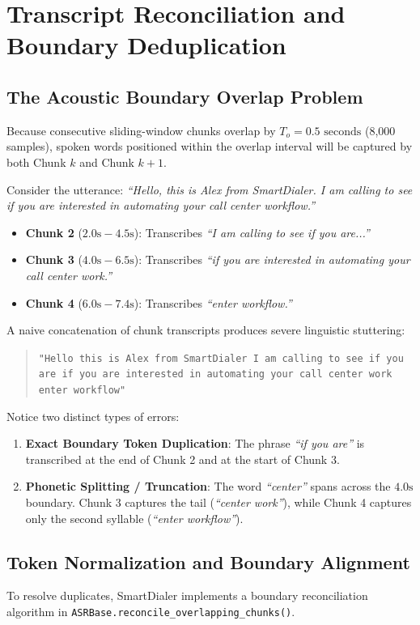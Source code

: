 \documentclass[11pt,a4paper,titlepage]{report}
\begin{document}
\newpage

\chapter{Transcript Reconciliation and Boundary Deduplication}

\section{The Acoustic Boundary Overlap Problem}
Because consecutive sliding-window chunks overlap by $T_o = 0.5\text{ seconds}$ (8,000 samples), spoken words positioned within the overlap interval will be captured by both Chunk $k$ and Chunk $k+1$. 

Consider the utterance: \textit{``Hello, this is Alex from SmartDialer. I am calling to see if you are interested in automating your call center workflow.''}
\begin{itemize}
    \item \textbf{Chunk 2} ($2.0\text{s} - 4.5\text{s}$): Transcribes \textit{``I am calling to see if you are...''}
    \item \textbf{Chunk 3} ($4.0\text{s} - 6.5\text{s}$): Transcribes \textit{``if you are interested in automating your call center work.''}
    \item \textbf{Chunk 4} ($6.0\text{s} - 7.4\text{s}$): Transcribes \textit{``enter workflow.''}
\end{itemize}

A naive concatenation of chunk transcripts produces severe linguistic stuttering:
\begin{quote}
    \texttt{"Hello this is Alex from SmartDialer I am calling to see if you are if you are interested in automating your call center work enter workflow"}
\end{quote}
Notice two distinct types of errors:
\begin{enumerate}
    \item \textbf{Exact Boundary Token Duplication}: The phrase \textit{``if you are''} is transcribed at the end of Chunk 2 and at the start of Chunk 3.
    \item \textbf{Phonetic Splitting / Truncation}: The word \textit{``center''} spans across the $4.0\text{s}$ boundary. Chunk 3 captures the tail (\textit{``center work''}), while Chunk 4 captures only the second syllable (\textit{``enter workflow''}).
\end{enumerate}

\section{Token Normalization and Boundary Alignment}
To resolve duplicates, SmartDialer implements a boundary reconciliation algorithm in \texttt{ASRBase.reconcile\_overlapping\_chunks()}.
\end{document}
